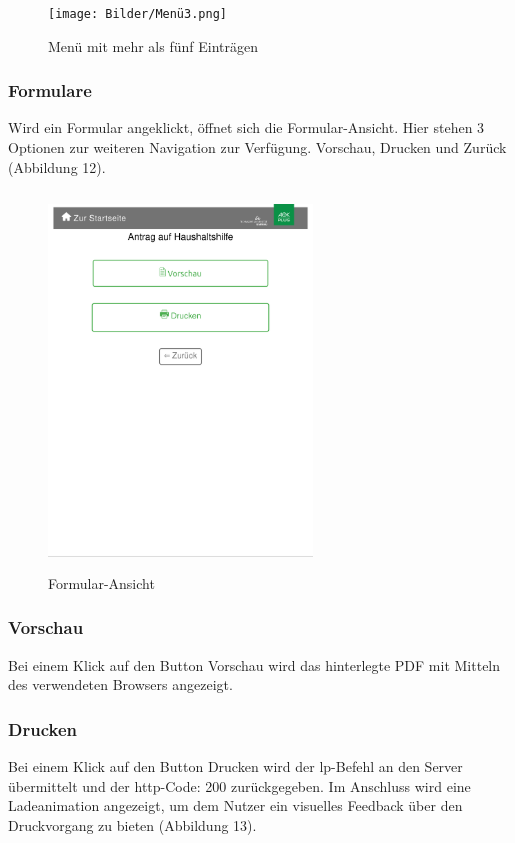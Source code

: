 \begin{figure}[htp]
    \centering
    \texttt{[image: Bilder/Menü3.png]}
    \caption[Startseite des Self-Service-Terminals]{Menü mit mehr als fünf Einträgen}
    \label{fig:SSTMenüPagination}
\end{figure}

\newpage

\subsubsection{Formulare}Wird ein Formular angeklickt, öffnet sich die Formular-Ansicht. Hier stehen 3 Optionen zur weiteren Navigation zur Verfügung. \glqq Vorschau\grqq{}, \glqq Drucken\grqq{} und \glqq Zurück\grqq{} (Abbildung 12).

\begin{figure}[htp]
    \centering
    \includegraphics[width=7cm , height=10cm]{Bilder/Formular1.png}
    \caption[Startseite des Self-Service-Terminals]{Formular-Ansicht}
    \label{fig:SSTFormular}
\end{figure}

\subsubsection{Vorschau} Bei einem Klick auf den Button \glqq Vorschau\grqq{} wird das hinterlegte PDF mit Mitteln des verwendeten Browsers angezeigt.

\newpage

\subsubsection{Drucken} Bei einem Klick auf den Button \glqq Drucken\grqq{} wird der lp-Befehl an den Server übermittelt und der http-Code: 200 zurückgegeben. Im Anschluss wird eine Ladeanimation angezeigt, um dem Nutzer ein visuelles Feedback über den Druckvorgang zu bieten (Abbildung 13).

